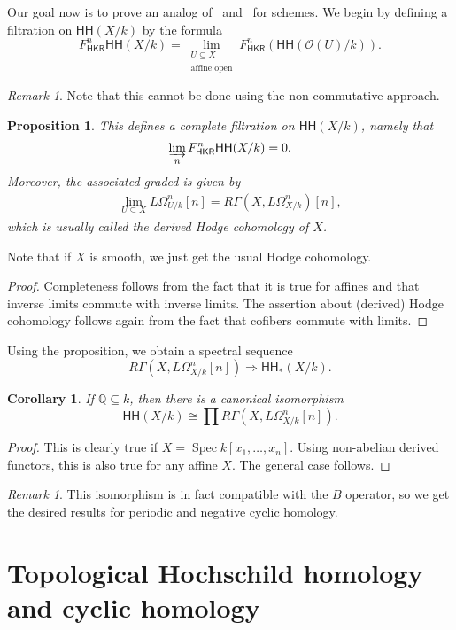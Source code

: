 \documentclass[10pt]{amsart}
\newtheorem{cor}[thm]{Corollary}
\newtheorem{prop}[thm]{Proposition}
\theoremstyle{definition}
\theoremstyle{remark}
\newtheorem{rmk}[thm]{Remark}
\theoremstyle{plain}
\theoremstyle{definition}
\theoremstyle{remark}
\newcommand{\Q}{\mathbb{Q}}
\newcommand{\mc}[1]{\mathcal{#1}}
\newcommand{\ms}[1]{\mathsf{#1}}
\newcommand{\1}{\mathbf{1}}
\newcommand{\2}{\mathbf{2}}
\newcommand{\3}{\mathbf{3}}
\newcommand{\HH}{\ms{HH}}
\DeclareMathOperator{\Spec}{Spec}
\begin{document}
Our goal now is to prove an analog of~ and~ for schemes. We begin by defining a filtration on $\HH(X/k)$ by the formula
\[ F^n_{\ms{HKR}}\HH(X/k) = \lim_{\substack{U \subseteq X \\ \text{affine open}}} F^n_{\ms{HKR}}(\HH(\mc{O}(U)/k)). \]
\begin{rmk}
    Note that this cannot be done using the non-commutative approach.
\end{rmk}
\begin{prop}
    This defines a complete filtration on $\HH(X/k)$, namely that
    \[ \varinjlim_n F^n_{\ms{HKR}} \HH(X/k) = 0. \]
    Moreover, the associated graded is given by
    \begin{align*}
        \lim_{U \subseteq X} L\Omega^n_{U/k}[n] = R\Gamma(X, L\Omega^n_{X/k})[n],
    \end{align*}
    which is usually called the \textit{derived Hodge cohomology} of $X$.
\end{prop}
Note that if $X$ is smooth, we just get the usual Hodge cohomology.

\begin{proof}
    Completeness follows from the fact that it is true for affines and that inverse limits commute with inverse limits. The assertion about (derived) Hodge cohomology follows again from the fact that cofibers commute with limits.
\end{proof}

Using the proposition, we obtain a spectral sequence
\[ R \Gamma (X, L\Omega^n_{X/k}[n]) \Longrightarrow \HH_*(X/k). \]
\begin{cor}
    If $\Q \subseteq k$, then there is a canonical isomorphism
    \[ \HH(X/k) \cong \prod R\Gamma(X, L\Omega^n_{X/k}[n]). \]
\end{cor}

\begin{proof}
    This is clearly true if $X = \Spec k[x_1, \ldots, x_n]$. Using non-abelian derived functors, this is also true for any affine $X$. The general case follows.
\end{proof}

\begin{rmk}
    This isomorphism is in fact compatible with the $B$ operator, so we get the desired results for periodic and negative cyclic homology.
\end{rmk}

\section{Topological Hochschild homology and cyclic homology}%
\label{sec:Topological Hochschild homology and cyclic homology}
\end{document}
